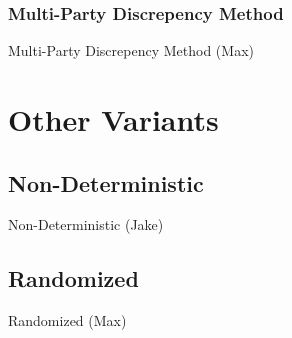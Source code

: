 \documentclass{beamer}
\begin{document}
\subsubsection{Multi-Party Discrepency Method}

\begin{frame}{Multi-Party Discrepency Method (Max)}
\TODO
\end{frame}

\section{Other Variants}

\subsection{Non-Deterministic}

\begin{frame}{Non-Deterministic (Jake)}
\TODO
\end{frame}

\subsection{Randomized}

\begin{frame}{Randomized (Max)}
\TODO
\end{frame}
\end{document}

